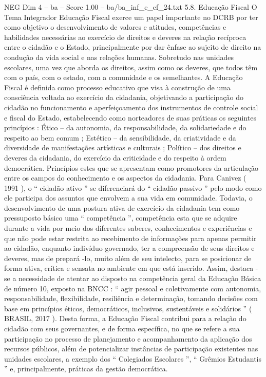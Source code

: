 \begin{textsample}{NEG Dim 4 – ba – Score 1.00 – ba/ba\_inf\_e\_ef\_24.txt}  \label{ex:f4_neg_267}
5.8.
Educação Fiscal O Tema Integrador Educação Fiscal exerce um papel importante no DCRB por ter como objetivo o desenvolvimento de valores e atitudes, competências e habilidades necessárias ao exercício de direitos e deveres na relação recíproca entre o cidadão e o Estado, principalmente por dar ênfase ao sujeito de direito na condução da vida social e nas relações humanas.
Sobretudo nas unidades escolares, uma vez que aborda os direitos, assim como os deveres, que todos têm com o país, com o estado, com a comunidade e os semelhantes.
A Educação Fiscal é definida como processo educativo que visa à construção de uma consciência voltada ao exercício da cidadania, objetivando a participação do cidadão no funcionamento e aperfeiçoamento dos instrumentos de controle social e fiscal do Estado, estabelecendo como norteadores de suas práticas os seguintes princípios : Ético – da autonomia, da responsabilidade, da solidariedade e do respeito ao bem comum ; Estético – da sensibilidade, da criatividade e da diversidade de manifestações artísticas e culturais ; Político – dos direitos e deveres da cidadania, do exercício da criticidade e do respeito à ordem democrática.
Princípios estes que se apresentam como promotores da articulação entre os campos do conhecimento e os aspectos da cidadania.
Para Canivez ( 1991 ), o “ cidadão ativo ” se diferenciará do “ cidadão passivo ” pelo modo como ele participa dos assuntos que envolvem a sua vida em comunidade.
Todavia, o desenvolvimento de uma postura ativa de exercício da cidadania tem como pressuposto básico uma “ competência ”, competência esta que se adquire durante a vida por meio dos diferentes saberes, conhecimentos e experiências e que não pode estar restrita ao recebimento de informações para apenas permitir ao cidadão, enquanto indivíduo governado, ter a compreensão de seus direitos e deveres, mas de prepará -lo, muito além de seu intelecto, para se posicionar de forma ativa, crítica e sensata no ambiente em que está inserido.
Assim, destaca -se a necessidade de atentar ao disposto na competência geral da Educação Básica de número 10, exposto na BNCC : “ agir pessoal e coletivamente com autonomia, responsabilidade, flexibilidade, resiliência e determinação, tomando decisões com base em princípios éticos, democráticos, inclusivos, sustentáveis e solidários ” ( BRASIL, 2017 ).
Desta forma, a Educação Fiscal contribui para a relação do cidadão com seus governantes, e de forma específica, no que se refere a sua participação no processo de planejamento e acompanhamento da aplicação dos recursos públicos, além de potencializar instâncias de participação existentes nas unidades escolares, a exemplo dos “ Colegiados Escolares ”, “ Grêmios Estudantis ” e, principalmente, práticas da gestão democrática.

\end{textsample}
